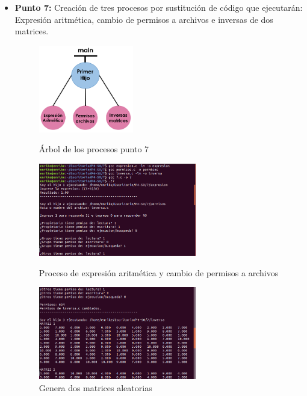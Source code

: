 \documentclass[12pt]{article}
\begin{document}
\begin{itemize}
                \newpage
                \item[\Checkmark] \textbf{Punto 7:} Creación de tres procesos por sustitución de código que ejecutarán: Expresión aritmética, cambio de permisos a archivos e inversas de dos matrices.
                    \begin{figure}[h!]
                        \centering
                         \includegraphics[width=0.39\textwidth]{Practica4/Images/Linux/arbol7.PNG}
                        \caption{Árbol de los procesos punto 7}
                         \includegraphics[width=0.65\textwidth]{Practica4/Images/Linux/7_1.png}
                        \caption{Proceso de expresión aritmética y cambio de permisos a archivos}
                        \includegraphics[width=0.65\textwidth]{Practica4/Images/Linux/7_2.png}
                        \caption{Genera dos matrices aleatorias}
                        
                \end{figure}


\end{itemize}
\end{document}
